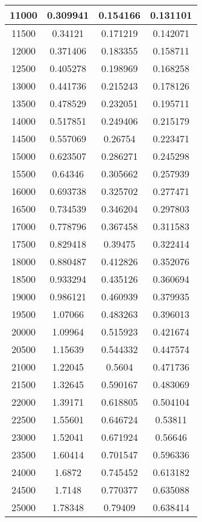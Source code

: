 \documentclass{article}
\begin{document}
\begin{longtable}{|c|c|c|c|}
			11000  &	0.309941	&  0.154166	       &  0.131101   \\ \hline
			11500  &	0.34121	    &  0.171219	       &  0.142071   \\ \hline
			12000  &	0.371406	&  0.183355	       &  0.158711   \\ \hline
			12500  &	0.405278	&  0.198969	       &  0.168258   \\ \hline
			13000  &	0.441736	&  0.215243	       &  0.178126   \\ \hline
			13500  &	0.478529	&  0.232051	       &  0.195711   \\ \hline
			14000  &	0.517851	&  0.249406	       &  0.215179   \\ \hline
			14500  &	0.557069	&  0.26754	       &  0.223471   \\ \hline
			15000  &	0.623507	&  0.286271	       &  0.245298   \\ \hline
			15500  &	0.64346	    &  0.305662	       &  0.257939   \\ \hline
			16000  &	0.693738	&  0.325702	       &  0.277471   \\ \hline
			16500  &	0.734539	&  0.346204	       &  0.297803   \\ \hline
			17000  &	0.778796	&  0.367458	       &  0.311583   \\ \hline
			17500  &	0.829418	&  0.39475	       &  0.322414   \\ \hline
			18000  &	0.880487	&  0.412826	       &  0.352076   \\ \hline
			18500  &	0.933294	&  0.435126	       &  0.360694   \\ \hline
			19000  &	0.986121	&  0.460939	       &  0.379935   \\ \hline
			19500  &	1.07066	    &  0.483263	       &  0.396013   \\ \hline
			20000  &	1.09964	    &  0.515923	       &  0.421674   \\ \hline
			20500  &	1.15639	    &  0.544332	       &  0.447574   \\ \hline
			21000  &	1.22045	    &  0.5604	       &  0.471736   \\ \hline
			21500  &	1.32645	    &  0.590167	       &  0.483069   \\ \hline
			22000  &	1.39171	    &  0.618805	       &  0.504104   \\ \hline
			22500  &	1.55601	    &  0.646724	       &  0.53811   \\ \hline
			23000  &	1.52041	    &  0.671924	       &  0.56646   \\ \hline
			23500  &	1.60414	    &  0.701547	       &  0.596336   \\ \hline
			24000  &	1.6872	    &  0.745452	       &  0.613182   \\ \hline
			24500  &	1.7148	    &  0.770377	       &  0.635088   \\ \hline
			25000  &	1.78348	    &  0.79409	       &  0.638414   \\ \hline
		\end{longtable}
\end{document}
